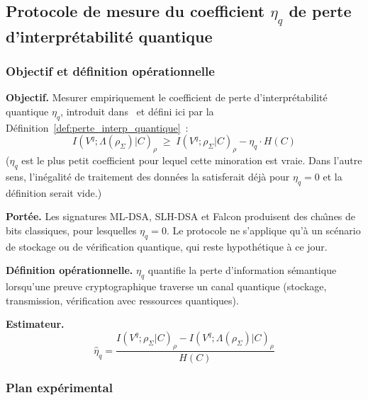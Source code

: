 \subsection{Protocole de mesure du coefficient $\eta_q$ de perte d'interpr\'etabilit\'e quantique}
\label{subsec:protocole_eta_q}
\begin{sloppypar}

\subsubsection{Objectif et d\'efinition op\'erationnelle}
\label{subsubsec:objectif_eta_q}

\noindent\textbf{Objectif.} Mesurer empiriquement le coefficient de perte
d'interpr\'etabilit\'e quantique $\eta_q$, introduit
dans~\cite{MINKA2026PQCRO} et d\'efini ici par la D\'efinition~\ref{def:perte_interp_quantique}~:
\begin{equation}
I(V^q; \Lambda(\rho_\Sigma)|C)_\rho \;\geq\; I(V^q; \rho_\Sigma|C)_\rho - \eta_q \cdot H(C)
\label{eq:perte_interpretabilite_op}
\end{equation}
($\eta_q$ est le plus petit coefficient pour lequel cette minoration est
vraie. Dans l'autre sens, l'in\'egalit\'e de traitement des donn\'ees la satisferait d\'ej\`a pour $\eta_q = 0$
et la d\'efinition serait vide.)

\noindent\textbf{Port\'ee.} Les signatures ML-DSA, SLH-DSA et Falcon produisent
des cha\^{\i}nes de bits classiques, pour lesquelles $\eta_q = 0$. Le protocole
ne s'applique qu'\`a un sc\'enario de stockage ou de v\'erification quantique,
qui reste hypoth\'etique \`a ce jour.

\noindent\textbf{D\'efinition op\'erationnelle.} $\eta_q$ quantifie la perte
d'information s\'emantique lorsqu'une preuve cryptographique traverse un canal
quantique (stockage, transmission, v\'erification avec ressources quantiques).

\noindent\textbf{Estimateur.}
\begin{equation}
\hat\eta_q = \frac{I(V^q; \rho_\Sigma|C)_\rho - I(V^q; \Lambda(\rho_\Sigma)|C)_\rho}{H(C)}
\label{eq:estimateur_eta_q}
\end{equation}

\subsubsection{Plan exp\'erimental}
\label{subsubsec:design_eta_q}


\end{sloppypar}
